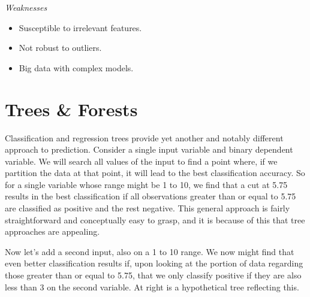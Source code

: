 \documentclass[english,nohyper,titlepage]{tufte-handout}\usepackage{knitr}
\begin{document}
\noindent\emph{Weaknesses}
\begin{itemize}
  \item Susceptible to irrelevant features.
  \item Not robust to outliers.
  \item Big data with complex models.
\end{itemize}

\section{Trees \& Forests}

Classification and regression trees provide yet another and notably different approach to prediction.  Consider a single input variable and binary dependent variable.  We will search all values of the input to find a point where, if we partition the data at that point, it will lead to the best classification accuracy.  So for a single variable whose range might be 1 to 10, we find that a cut at 5.75 results in the best classification if all observations greater than or equal to 5.75 are classified as positive and the rest negative.  This general approach is fairly straightforward and conceptually easy to grasp, and it is because of this that tree approaches are appealing.  


Now let's add a second input, also on a 1 to 10 range.  We now might find that even better classification results if, upon looking at the portion of data regarding those greater than or equal to 5.75, that we only classify positive if they are also less than 3 on the second variable.  At right is a hypothetical tree reflecting this.
\end{document}
